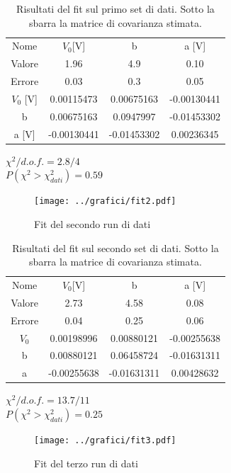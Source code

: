 \documentclass[a4paper,10pt]{article}
\begin{document}
\begin{table}[H]
	\centering
	\begin{tabular}{cccc}
	Nome	&	$ V_0 $[V] &  b          & a [V]\\
	Valore  & 1.96   & 4.9  & 0.10\\ 
	Errore  & 0.03 & 0.3 & 0.05\\
	\hline
	$V_0$ [V] & 0.00115473  & 0.00675163  & -0.00130441\\
	b  	    & 0.00675163  & 0.0947997   & -0.01453302\\
	a [V]   & -0.00130441 & -0.01453302 & 0.00236345\\
\end{tabular}
\caption{Risultati del fit sul primo set di dati. Sotto la sbarra la matrice di covarianza stimata.}
\label{tab:s6}
\end{table}


$\chi^2/d.o.f.= 2.8/4$ \\
$P(\chi^2>\chi^2_{dati})= 0.59$\\
 
\begin{figure}[H]
	\centering
	\texttt{[image: ../grafici/fit2.pdf]}
	\caption{Fit del secondo run di dati}
	\label{fig:RUN2}
\end{figure} 

\begin{table}[H]
	\centering
	\begin{tabular}{cccc}
	Nome	&	$ V_0 $[V] &  b      & a [V]\\
	Valore  &   2.73 & 4.58  & 0.08\\
	Errore	& 0.04   & 0.25  & 0.06\\ 
\hline 
	$V_0$ & 0.00198996 & 0.00880121  &-0.00255638\\
 	b     & 0.00880121 & 0.06458724  &-0.01631311\\
 	a     &-0.00255638 & -0.01631311 & 0.00428632\\
\end{tabular}
\caption{Risultati del fit sul secondo set di dati. Sotto la sbarra la matrice di covarianza stimata.}
\label{tab:s6}
\end{table}

$\chi^2/d.o.f.= 13.7/11$ \\
$P(\chi^2>\chi^2_{dati})= 0.25$\\

\begin{figure}[H]
	\centering
	\texttt{[image: ../grafici/fit3.pdf]}
	\caption{Fit del terzo run di dati}
	\label{fig:RUN3}
\end{figure} 
\end{document}
